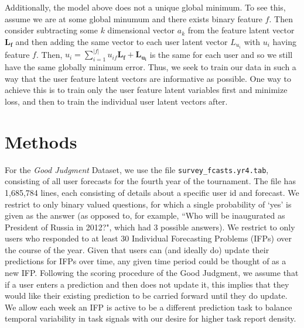 \documentclass{article}
\begin{document}
Additionally, the model above does not a unique global minimum. To see this, assume we are at some global minumum and there exists binary feature $f$. Then consider subtracting some $k$ dimensional vector $a_{k}$ from the feature latent vector $\mathbf{L_{f}}$ and then adding the same vector to each user latent vector $L_{u_{i}}$ with $u_{i}$ having feature $f$. Then, $u_{i} = \sum_{i=1}^{\vert f \vert} u_{if} \mathbf{L_{f}} + \mathbf{L_{u_{i}}}$ is the same for each user and so we still have the same globally minimum error. Thus, we seek to train our data in such a way that the user feature latent vectors are informative as possible. One way to achieve this is to train only the user feature latent variables first and minimize loss, and then to train the individual user latent vectors after. 


\section{Methods}





For the \emph{Good Judgment} Dataset, we use the file \texttt{survey\_fcasts.yr4.tab}, consisting of all user forecasts for the fourth year of the tournament. The file has 1,685,784 lines, each consisting of details about a specific user id and forecast. We restrict to only binary valued questions, for which a single probability of `yes' is given as the answer (as opposed to, for example, ``Who will be inaugurated as President of Russia in 2012?", which had 3 possible answers). We restrict to only users who responded to at least 30 Individual Forecasting Problems (IFPs) over the course of the year. Given that users can (and ideally do) update their predictions for IFPs over time, any given time period could be thought of as a new IFP. Following the scoring procedure of the Good Judgment, we assume that if a user enters a prediction and then does not update it, this implies that they would like their existing prediction to be carried forward until they do update. We allow each week an IFP is active to be a different prediction task to balance temporal variability in task signals with our desire for higher task report density.
\end{document}
